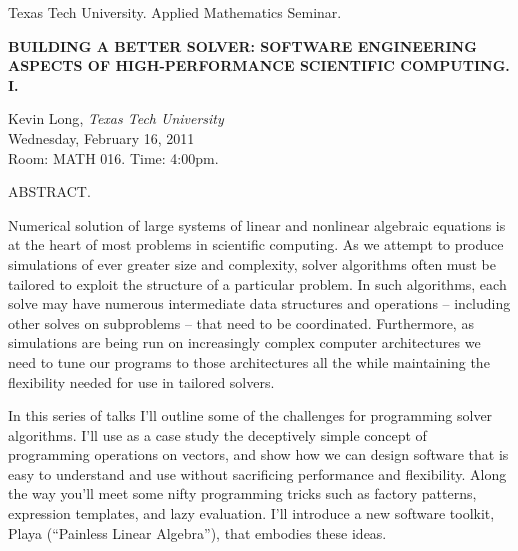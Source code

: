 \documentclass[oneside]{amsart}
\newcommand{\talktitle}{Building a better solver: software engineering aspects of 
high-performance scientific computing. I.}
\newcommand{\talkspeaker}{ {\sc Kevin Long}, \textit{Texas Tech University}}
\newcommand{\talkdate}{Wednesday, February 16, 2011}
\newcommand{\timelocation}{Room: MATH 016.  Time: 4:00pm.}
\newcommand{\talkabstract}{
{\Huge Numerical solution of large systems of linear and nonlinear algebraic 
equations is at the heart of most problems in scientific computing. As we 
attempt to produce simulations of ever greater size and complexity, solver 
algorithms often must be tailored to exploit the structure of a particular 
problem. In such algorithms, each solve may have numerous
intermediate data structures and operations -- including other solves on subproblems -- that 
need to be coordinated. Furthermore, as simulations are being run on 
increasingly complex computer architectures we need to tune our programs to 
those architectures all the while maintaining the flexibility needed for use 
in tailored solvers.}

{\Huge
In this series of talks I'll outline some of the challenges for programming 
solver algorithms. I'll use as a case study the deceptively simple concept of 
programming operations on vectors, and show how we can design  software that 
is easy to understand and use without sacrificing performance and 
flexibility. Along the way you'll meet some nifty programming tricks such as 
factory patterns, expression templates, and lazy evaluation. I'll introduce a 
new software toolkit, Playa (``Painless Linear Algebra''), that embodies these 
ideas. 
}
}
\begin{document}
\thispagestyle{empty}

\begin{center}
Texas Tech University.  Applied Mathematics Seminar.
\end{center}

\begin{center}

\textbf{\Huge {\uppercase{\talktitle}} }

{\Large
\talkspeaker\\
\talkdate\\
\timelocation
}
\end{center}

\vspace*{10pt}

{\LARGE
ABSTRACT.}
{\talkabstract}
\end{document}
